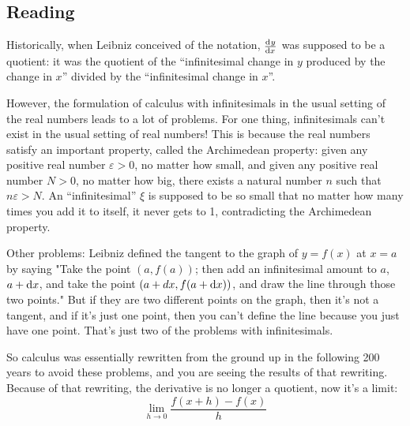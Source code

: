 


\subsection*{Reading}
Historically, when Leibniz conceived of the notation, $ \od{y}{x} $ was supposed to be a quotient: it was the quotient of the ``infinitesimal change in $y$ produced by the change in $x$'' divided by the ``infinitesimal change in $x$''.

However, the formulation of calculus with infinitesimals in the usual setting of the real numbers leads to a lot of problems. For one thing, infinitesimals can't exist in the usual setting of real numbers! This is because the real numbers satisfy an important property, called the Archimedean property: given any positive real number $ \varepsilon > 0 $, no matter how small, and given any positive real number $ N > 0 $, no matter how big, there exists a natural number $n$ such that $n \varepsilon > N$. An ``infinitesimal'' $ \xi $ is supposed to be so small that no matter how many times you add it to itself, it never gets to 1, contradicting the Archimedean property.

Other problems: Leibniz defined the tangent to the graph of $y=f(x)$ at $x=a$ by saying "Take the point $(a,f(a))$; then add an infinitesimal amount to $a$, $a+\dif{x}$, and take the point $(a+dx,f(a+\dif{x}))$, and draw the line through those two points." But if they are two different points on the graph, then it's not a tangent, and if it's just one point, then you can't define the line because you just have one point. That's just two of the problems with infinitesimals.

So calculus was essentially rewritten from the ground up in the following 200 years to avoid these problems, and you are seeing the results of that rewriting. Because of that rewriting, the derivative is no longer a quotient, now it's a limit:
\begin{displaymath}
  \lim_{h \to 0} \frac{f(x + h) - f(x)}{h}
\end{displaymath}

